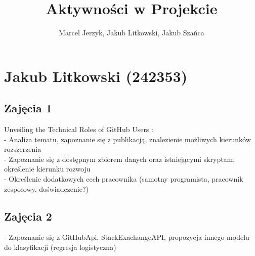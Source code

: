 \documentclass[graybox]{svmult}
\begin{document}
\title*{Aktywności w Projekcie}
\author{Marcel Jerzyk, Jakub Litkowski, Jakub Szańca}

\maketitle


\newpage

\section{Jakub Litkowski (242353)}
\subsection{Zajęcia 1}
Unveiling the Technical Roles of GitHub Users :
\\- Analiza tematu, zapoznanie się z publikacją, znalezienie możliwych kierunków rozszerzenia 
\\- Zapoznanie się z dostępnym zbiorem danych oraz istniejącymi skryptam, określenie kierunku rozwoju
\\- Określenie dodatkowych cech pracownika (samotny programista, pracownik zespołowy, doświadczenie?)
\subsection{Zajęcia 2}
- Zapoznanie się z GitHubApi, StackExachangeAPI, propozycja innego modelu do klasyfikacji (regresja logistyczna)
\end{document}
